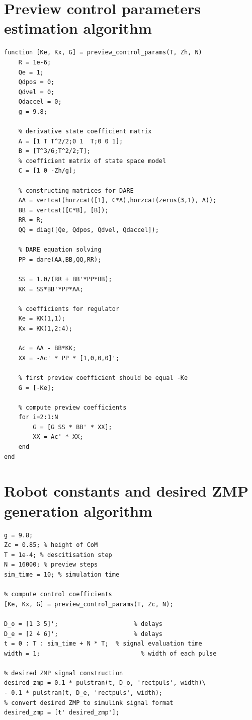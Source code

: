 \documentclass[12pt,a4paper]{report}
\begin{document}
	\begin{appendices}
		\chapter{Preview control parameters estimation algorithm}
			\begin{lstlisting}
function [Ke, Kx, G] = preview_control_params(T, Zh, N)
	R = 1e-6;
	Qe = 1;
	Qdpos = 0;
	Qdvel = 0;
	Qdaccel = 0;
	g = 9.8;
	
	% derivative state coefficient matrix
	A = [1 T T^2/2;0 1  T;0 0 1];
	B = [T^3/6;T^2/2;T];
	% coefficient matrix of state space model
	C = [1 0 -Zh/g];
	
	% constructing matrices for DARE
	AA = vertcat(horzcat([1], C*A),horzcat(zeros(3,1), A));
	BB = vertcat([C*B], [B]);
	RR = R;
	QQ = diag([Qe, Qdpos, Qdvel, Qdaccel]);
	
	% DARE equation solving
	PP = dare(AA,BB,QQ,RR);
	
	SS = 1.0/(RR + BB'*PP*BB);
	KK = SS*BB'*PP*AA;
	
	% coefficients for regulator
	Ke = KK(1,1);
	Kx = KK(1,2:4);
	
	Ac = AA - BB*KK;
	XX = -Ac' * PP * [1,0,0,0]';
	
	% first preview coefficient should be equal -Ke
	G = [-Ke];
	
	% compute preview coefficients
	for i=2:1:N
		G = [G SS * BB' * XX];
		XX = Ac' * XX;
	end
end
			\end{lstlisting}
		\chapter{Robot constants and desired ZMP generation algorithm}
			\begin{lstlisting}
g = 9.8;
Zc = 0.85; % height of CoM
T = 1e-4; % descitisation step
N = 16000; % preview steps
sim_time = 10; % simulation time

% compute control coefficients
[Ke, Kx, G] = preview_control_params(T, Zc, N);

D_o = [1 3 5]';                     % delays
D_e = [2 4 6]';                     % delays
t = 0 : T : sim_time + N * T;  % signal evaluation time
width = 1;                            % width of each pulse

% desired ZMP signal construction
desired_zmp = 0.1 * pulstran(t, D_o, 'rectpuls', width)\
- 0.1 * pulstran(t, D_e, 'rectpuls', width);
% convert desired ZMP to simulink signal format
desired_zmp = [t' desired_zmp'];
			\end{lstlisting}
	\end{appendices}
  
\end{document}
